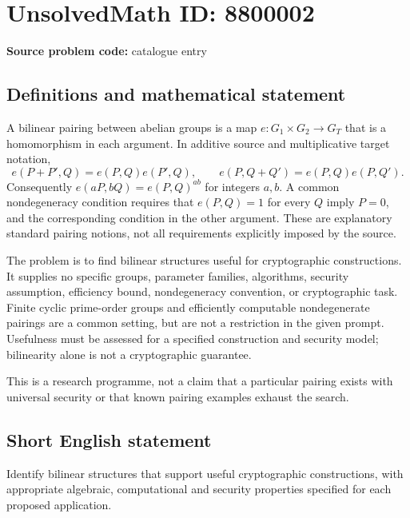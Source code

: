 \documentclass[11pt]{article}
\begin{document}
\section*{UnsolvedMath ID: 8800002}
\textbf{Source problem code:} catalogue entry
\subsection{Definitions and mathematical statement}
A bilinear pairing between abelian groups is a map $e:G_1\times G_2\to G_T$ that is a homomorphism in each argument. In additive source and multiplicative target notation,
\[
e(P+P',Q)=e(P,Q)e(P',Q),\qquad
e(P,Q+Q')=e(P,Q)e(P,Q').
\]
Consequently $e(aP,bQ)=e(P,Q)^{ab}$ for integers $a,b$. A common nondegeneracy condition requires that $e(P,Q)=1$ for every $Q$ imply $P=0$, and the corresponding condition in the other argument. These are explanatory standard pairing notions, not all requirements explicitly imposed by the source.

The problem is to find bilinear structures useful for cryptographic constructions. It supplies no specific groups, parameter families, algorithms, security assumption, efficiency bound, nondegeneracy convention, or cryptographic task. Finite cyclic prime-order groups and efficiently computable nondegenerate pairings are a common setting, but are not a restriction in the given prompt. Usefulness must be assessed for a specified construction and security model; bilinearity alone is not a cryptographic guarantee.

This is a research programme, not a claim that a particular pairing exists with universal security or that known pairing examples exhaust the search.
\subsection{Short English statement}
Identify bilinear structures that support useful cryptographic constructions, with appropriate algebraic, computational and security properties specified for each proposed application.
\end{document}
